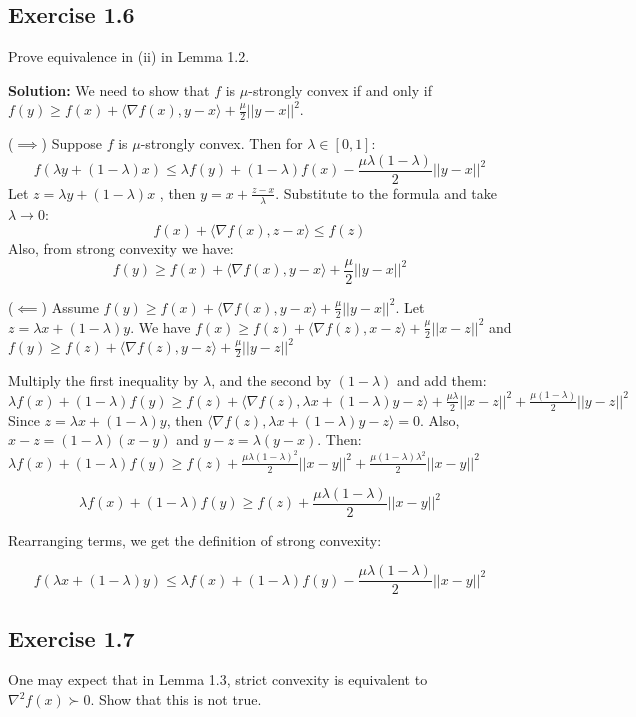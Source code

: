 \documentclass{article}
\begin{document}
\subsection*{Exercise 1.6}
Prove equivalence in (ii) in Lemma 1.2.

\textbf{Solution:}
We need to show that $f$ is $\mu$-strongly convex if and only if $f(y) \geq f(x) + \langle \nabla f(x), y-x \rangle + \frac{\mu}{2}||y-x||^2$.

($\implies$) Suppose $f$ is $\mu$-strongly convex. Then for $\lambda \in [0, 1]$:
$$f(\lambda y + (1-\lambda)x) \leq \lambda f(y) + (1-\lambda) f(x) - \frac{\mu\lambda(1-\lambda)}{2} ||y-x||^2$$
Let $z = \lambda y + (1-\lambda)x$ , then $y = x + \frac{z-x}{\lambda}$. Substitute to the formula and take $\lambda \rightarrow 0$:
$$f(x) + \langle \nabla f(x), z-x \rangle \leq f(z)$$
Also, from strong convexity we have:
$$f(y) \geq f(x) + \langle \nabla f(x), y-x \rangle + \frac{\mu}{2}||y-x||^2$$

($\impliedby$)
Assume $f(y) \geq f(x) + \langle \nabla f(x), y-x \rangle + \frac{\mu}{2}||y-x||^2$.
Let $z = \lambda x + (1 - \lambda) y$.
We have
$f(x) \geq f(z) + \langle \nabla f(z), x - z \rangle + \frac{\mu}{2} ||x - z||^2$
and
$f(y) \geq f(z) + \langle \nabla f(z), y - z \rangle + \frac{\mu}{2} ||y - z||^2$

Multiply the first inequality by $\lambda$, and the second by $(1 - \lambda)$ and add them:
$\lambda f(x) + (1 - \lambda) f(y) \geq f(z) + \langle \nabla f(z), \lambda x + (1 - \lambda) y - z \rangle + \frac{\mu\lambda}{2} ||x - z||^2 + \frac{\mu(1 - \lambda)}{2} ||y - z||^2$
Since $z = \lambda x + (1 - \lambda) y$, then $\langle \nabla f(z), \lambda x + (1 - \lambda) y - z \rangle = 0$.  Also, $x - z = (1 - \lambda)(x - y)$ and $y - z = \lambda(y - x)$.  Then:
$\lambda f(x) + (1 - \lambda) f(y) \geq f(z) + \frac{\mu\lambda(1 - \lambda)^2}{2} ||x - y||^2 + \frac{\mu(1 - \lambda)\lambda^2}{2} ||x - y||^2$

$$\lambda f(x) + (1 - \lambda) f(y) \geq f(z) + \frac{\mu\lambda(1 - \lambda)}{2} ||x - y||^2$$

Rearranging terms, we get the definition of strong convexity:

$$f(\lambda x + (1 - \lambda) y) \leq \lambda f(x) + (1 - \lambda) f(y) - \frac{\mu\lambda(1 - \lambda)}{2} ||x - y||^2$$

\subsection*{Exercise 1.7}
One may expect that in Lemma 1.3, strict convexity is equivalent to $\nabla^2 f(x) \succ 0$. Show that this is not true.
\end{document}
